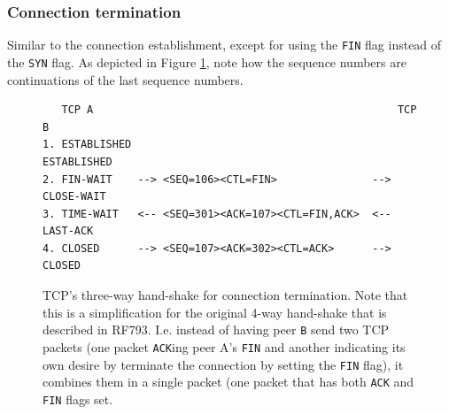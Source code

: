 \documentclass[pdftex,12pt,a4paper]{article}
\begin{document}
            \subsubsection{Connection termination}
                Similar to the connection establishment, except for using the
                \texttt{FIN} flag instead of the \texttt{SYN} flag. As depicted
                in Figure \ref{fig:tcpfin}, note how the sequence numbers are
                continuations of the last sequence numbers.

                \begin{figure}[tbh]
                        \centering
                        \small\begin{verbatim}   TCP A                                                TCP B
1. ESTABLISHED                                          ESTABLISHED
2. FIN-WAIT    --> <SEQ=106><CTL=FIN>               --> CLOSE-WAIT  
3. TIME-WAIT   <-- <SEQ=301><ACK=107><CTL=FIN,ACK>  <-- LAST-ACK    
4. CLOSED      --> <SEQ=107><ACK=302><CTL=ACK>      --> CLOSED\end{verbatim}\normalsize
                \vspace{-15pt}
                \caption{TCP's three-way hand-shake for connection termination.
                    Note that this is a simplification for the original 4-way
                    hand-shake that is described in RF793. I.e. instead of
                    having peer \texttt{B} send two TCP packets (one packet
                    \texttt{ACK}ing peer A's \texttt{FIN} and another indicating
                    its own desire by terminate the connection by setting the
                    \texttt{FIN} flag), it combines them in a single packet (one
                    packet that has both \texttt{ACK} and \texttt{FIN} flags set.}
                    \label{fig:tcpfin}
                \end{figure}
\end{document}
